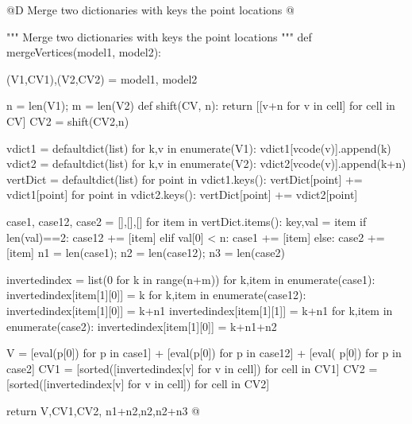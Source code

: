 \documentclass[11pt,oneside]{article}	%
\begin{document}
@D Merge two dictionaries with keys the point locations
@{""" Merge two dictionaries with keys the point locations """
def mergeVertices(model1, model2):

	(V1,CV1),(V2,CV2) = model1, model2

	n = len(V1); m = len(V2)
	def shift(CV, n): 
		return [[v+n for v in cell] for cell in CV]
	CV2 = shift(CV2,n)

	vdict1 = defaultdict(list)
	for k,v in enumerate(V1): vdict1[vcode(v)].append(k) 
	vdict2 = defaultdict(list)
	for k,v in enumerate(V2): vdict2[vcode(v)].append(k+n) 
	vertDict = defaultdict(list)
	for point in vdict1.keys(): vertDict[point] += vdict1[point]
	for point in vdict2.keys(): vertDict[point] += vdict2[point]

	case1, case12, case2 = [],[],[]
	for item in vertDict.items():
		key,val = item
		if len(val)==2:  case12 += [item]
		elif val[0] < n: case1 += [item]
		else: case2 += [item]
	n1 = len(case1); n2 = len(case12); n3 = len(case2)

	invertedindex = list(0 for k in range(n+m))
	for k,item in enumerate(case1):
		invertedindex[item[1][0]] = k
	for k,item in enumerate(case12):
		invertedindex[item[1][0]] = k+n1
		invertedindex[item[1][1]] = k+n1
	for k,item in enumerate(case2):
		invertedindex[item[1][0]] = k+n1+n2

	V = [eval(p[0]) for p in case1] + [eval(p[0]) for p in case12] + [eval(
				p[0]) for p in case2]
	CV1 = [sorted([invertedindex[v] for v in cell]) for cell in CV1]
	CV2 = [sorted([invertedindex[v] for v in cell]) for cell in CV2]

	return V,CV1,CV2, n1+n2,n2,n2+n3
@}
\end{document}
